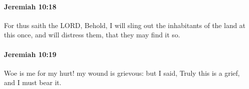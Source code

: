 		\paragraph{Jeremiah 10:18} %
			\label{JEREMIAH-10-18}

			For thus saith the LORD, Behold, I will sling out the inhabitants of the land at this once, and will distress them, that they may find it so.


		\paragraph{Jeremiah 10:19} %
			\label{JEREMIAH-10-19}

			Woe is me for my hurt! my wound is grievous: but I said, Truly this is a grief, and I must bear it.


